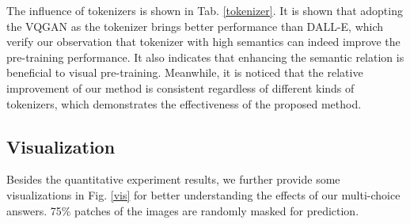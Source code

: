 \documentclass[runningheads]{llncs}
\begin{document}
\begin{table}[h]
\small
\centering
\caption{Ablation study on the different tokenizer.}
\label{tokenizer}

\end{table}

The influence of tokenizers is shown in Tab. \ref{tokenizer}. It is shown that adopting the VQGAN as the tokenizer brings better performance than DALL-E, which verify our observation that tokenizer with high semantics can indeed improve the pre-training performance. It also indicates that enhancing the semantic relation is beneficial to visual pre-training. Meanwhile, it is noticed that the relative improvement of our method is consistent regardless of different kinds of tokenizers, which demonstrates the effectiveness of the proposed method.

\subsection{Visualization}

Besides the quantitative experiment results, we further provide some visualizations in Fig. \ref{vis} for better understanding the effects of our multi-choice answers. 75\% patches of the images are randomly masked for prediction. 
\end{document}
